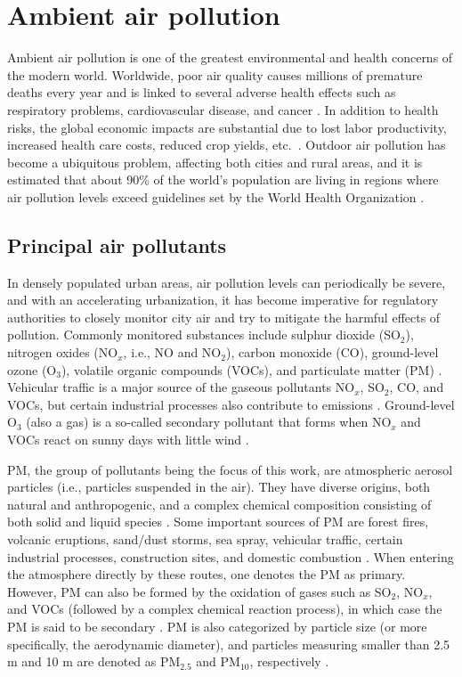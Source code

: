 \section{Ambient air pollution}

Ambient air pollution is one of the greatest environmental and health concerns of the modern world. Worldwide, poor air quality causes millions of premature deaths every year and is linked to several adverse health effects such as respiratory problems, cardiovascular disease, and cancer \cite{who2016}. In addition to health risks, the global economic impacts are substantial due to lost labor productivity, increased health care costs, reduced crop yields, etc.\ \cite{oecd2016}. Outdoor air pollution has become a ubiquitous problem, affecting both cities and rural areas, and it is estimated that about 90\% of the world's population are living in regions where air pollution levels exceed guidelines set by the World Health Organization \cite{who2016}. 

\subsection{Principal air pollutants}
\label{sec:airpollutants}
In densely populated urban areas, air pollution levels can periodically be severe, and with an accelerating urbanization, it has become imperative for regulatory authorities to closely monitor city air and try to mitigate the harmful effects of pollution. Commonly monitored substances include sulphur dioxide (SO$_2$), nitrogen oxides (NO$_x$, i.e., NO and NO$_2$), carbon monoxide (CO), ground-level ozone (O$_3$), volatile organic compounds (VOCs), and particulate matter (PM) \cite{VanLoon2010}. Vehicular traffic is a major source of the gaseous pollutants NO$_x$, SO$_2$, CO, and VOCs, but certain industrial processes also contribute to emissions \cite{VanLoon2010}. Ground-level O$_3$ (also a gas) is a so-called secondary pollutant that forms when NO$_x$ and VOCs react on sunny days with little wind \cite{VanLoon2010}. 

PM, the group of pollutants being the focus of this work, are atmospheric aerosol particles (i.e., particles suspended in the air). They have diverse origins, both natural and anthropogenic, and a complex chemical composition consisting of both solid and liquid species \cite{Schwarzenbach2016}. Some important sources of PM are forest fires, volcanic eruptions, sand/dust storms, sea spray, vehicular traffic, certain industrial processes, construction sites, and domestic combustion \cite{Querol2004, Schwarzenbach2016}. When entering the atmosphere directly by these routes, one denotes the PM as primary. However, PM can also be formed by the oxidation of gases such as SO$_2$, NO$_x$, and VOCs (followed by a complex chemical reaction process), in which case the PM is said to be secondary \cite{Schwarzenbach2016}. PM is also categorized by particle size (or more specifically, the aerodynamic diameter), and particles measuring smaller than 2.5 \textmugreek m and 10 \textmugreek m are denoted as PM$_{2.5}$ and PM$_{10}$, respectively \cite{Schwarzenbach2016}.

